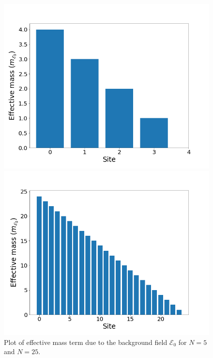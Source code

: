 \begin{figure}[htb]
	\centering
	\begin{minipage}{.5\textwidth}
		\centering
		\includegraphics[scale=0.27]{figures/effectiveMass_E_N=5.png}
	\end{minipage}%
	\begin{minipage}{0.5\textwidth}
		\centering
		\includegraphics[scale=0.27]{figures/effectiveMass_E_N=25.png}
	\end{minipage}
	\caption{Plot of effective mass term due to the background field $\mathcal{E}_0$ for $N=5$ and $N=25$.}
	\label{fig:effMassE}
\end{figure}


